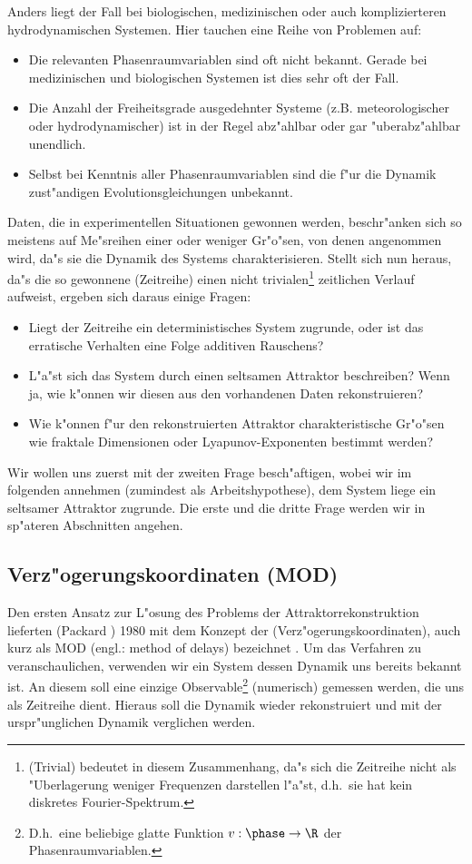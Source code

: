 Anders liegt der Fall bei biologischen, medizinischen oder auch komplizierteren
hydrodynamischen Systemen. Hier tauchen eine Reihe von Problemen auf:
\begin{itemize}
\item Die relevanten Phasenraumvariablen sind oft nicht bekannt. Gerade bei
medizinischen und biologischen Systemen ist dies sehr oft der Fall.
\item Die Anzahl der Freiheitsgrade ausgedehnter Systeme (z.B. meteorologischer oder
hydrodynamischer) ist in der Regel abz"ahlbar oder gar "uberabz"ahlbar unendlich. 
\item Selbst bei Kenntnis aller Phasenraumvariablen sind die f"ur die Dynamik zust"andigen
Evolutionsgleichungen unbekannt.
\end{itemize}
Daten, die in experimentellen Situationen gewonnen werden, beschr"anken sich so meistens
auf Me"sreihen einer oder weniger Gr"o"sen, von denen angenommen wird, da"s  sie die
Dynamik des Systems charakterisieren. Stellt sich nun heraus, da"s die so gewonnene
\begriff(Zeitreihe) einen nicht trivialen\footnote{\begriff(Trivial) bedeutet in diesem
  Zusammenhang, da"s sich die Zeitreihe nicht als "Uberlagerung weniger Frequenzen
  darstellen l"a"st, d.h.\  sie hat kein diskretes
Fourier-Spektrum.} zeitlichen Verlauf aufweist, ergeben sich daraus einige Fragen:
\begin{itemize}
\item Liegt der Zeitreihe ein deterministisches System zugrunde, oder ist das erratische
Verhalten eine Folge additiven Rauschens?
\item L"a"st sich das System durch einen seltsamen Attraktor beschreiben? Wenn ja, wie
k"onnen wir diesen aus den vorhandenen Daten rekonstruieren?
\item Wie k"onnen f"ur den rekonstruierten Attraktor charakteristische Gr"o"sen wie
fraktale Dimensionen oder Lyapunov-Exponenten bestimmt werden?
\end{itemize}
Wir wollen uns zuerst mit der zweiten Frage besch"aftigen, wobei wir im folgenden annehmen
(zumindest als Arbeitshypothese), dem System liege ein seltsamer Attraktor zugrunde.
Die erste und die dritte Frage werden wir in sp"ateren Abschnitten angehen.

\subsection{Verz"ogerungskoordinaten (MOD)}

Den ersten Ansatz zur L"osung des Problems der Attraktorrekonstruktion  lieferten
\linebreak \autor(Packard \etal) 1980
mit dem Konzept der \begriff(Verz"ogerungskoordinaten), auch kurz als
MOD (engl.: method of delays) bezeichnet \cite{Packard80}. Um das Verfahren 
zu veranschaulichen, verwenden wir ein System dessen Dynamik uns bereits bekannt ist. An
diesem soll eine einzige Observable\footnote{D.h.\   eine beliebige glatte Funktion
$v:\phase\to\R$ der Phasenraumvariablen.} (numerisch) gemessen werden, die uns als Zeitreihe
dient. Hieraus soll die Dynamik wieder rekonstruiert und mit der urspr"unglichen Dynamik
verglichen werden.

